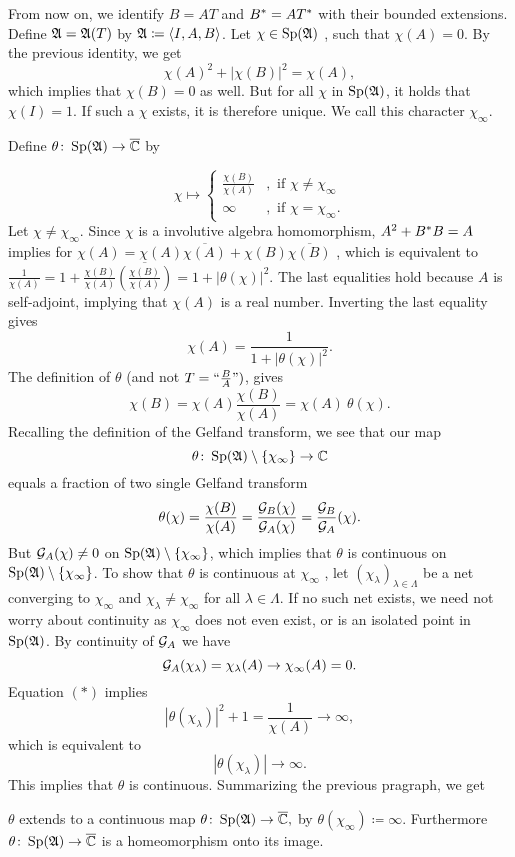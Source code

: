 From now on, we identify $B={AT}$ and $B^{*} ={AT^{*}}$
with their bounded extensions.
Define $\mathfrak{A} = \mathfrak{A}(T)$ by $\mathfrak{A} \coloneqq  \left\langle I, A, B  \right\rangle$. Let $ \chi \in \operatorname{Sp} (\mathfrak{A})$
, such that $\chi(A) =0$. By the previous identity, we get
\[
 \chi(A)^2 + |\chi(B)|^2 = \chi(A),
\]
which implies that $\chi(B) =0$ as well. But for all $\chi$ in  $\operatorname{Sp} (\mathfrak{A})$, 
 it holds that $\chi(I)=1$.
If such a $\chi$ exists, it is therefore unique. We call this
character $\chi_\infty$.

Define $\theta \colon \operatorname{Sp} (\mathfrak{A}) \to {\overline{\mathbb{C}}}$ by

 \[
 \chi \mapsto 
  \begin{cases}
    \frac{\chi(B)}{\chi(A)} &, \text{ if }\chi \neq \chi_\infty\\
    \infty &, \text{ if } \chi = \chi_\infty.
    \end{cases}
 \]
 Let $\chi \neq \chi_\infty$. Since $\chi$ is a involutive algebra homomorphism,
 $A^2 + B^{*} B = A$ implies for
   $\chi(A) = \chi(A) \overline{\chi(A)} + \chi(B) \overline{\chi(B)} $
, which is equivalent to  
  $ \frac{1}{\chi(A)} = 1 + \frac{\chi(B)}{\chi(A)} 
  \overline{\left( \frac{\chi(B)}{\chi(A)} \right)} = 1 + | \theta(\chi)|^2$.
 The last equalities hold because $A$ is self-adjoint, implying that $\chi(A)$ is a real number.
 Inverting the last equality gives
\[
 \chi(A) = \frac{1}{1 + |\theta (\chi)|^2} \tag{$\ast$}.
\]
The definition of $\theta$ (and not  $T = 
`` \frac{B}{A} ")$, gives
\[
 \chi(B) = \chi(A) \frac{\chi(B)}{\chi(A)}= \chi(A)~ \theta(\chi) 
 \tag{$\ast \ast$}.
\]
Recalling the definition of the Gelfand transform, we see that our map
\[
 \theta \colon \operatorname{Sp}(\mathfrak{A}) \setminus \left\lbrace\chi_\infty\right\rbrace \to \mathbb{C}
\]
equals a fraction of two single Gelfand transform
\[
 \theta(\chi) = \frac{\chi(B)}{\chi(A)} = \frac{\mathcal{G}_B (\chi)}{\mathcal{G}_A (\chi)}=
 \frac{\mathcal{G}_B}{\mathcal{G}_A}(\chi).
\]
But $\mathcal{G}_A(\chi) \neq 0$ on $\operatorname{Sp}(\mathfrak{A}) \setminus \left\lbrace\chi_\infty\right\rbrace$, which implies
that $\theta$ is continuous on $\operatorname{Sp}(\mathfrak{A}) \setminus \left\lbrace\chi_\infty\right\rbrace$. 
To show that $\theta$ is continuous at $\chi_\infty$
, let $ \left( \chi_\lambda \right) 
_{\lambda \in \Lambda}$ be a net converging to $\chi_\infty$ and 
$\chi_\lambda \neq \chi_\infty$ for all $\lambda \in \Lambda$. If 
no such net exists, we need not worry about continuity as $\chi_\infty$
does not even exist, or is an isolated point in $\operatorname{Sp}(\mathfrak{A})$.
By continuity of $\mathcal{G}_A$ we have
\[
 \mathcal{G}_A (\chi_\lambda) = \chi_\lambda (A) \to \chi_\infty (A) = 0.
\]
Equation $(\ast)$ implies
\[
 | \theta( \chi_\lambda ) | ^2  + 1 = \frac{1}{\chi(A)} \to \infty,
\]
which is equivalent to 
\[
 | \theta (\chi_\lambda ) | \to \infty.
\]
This implies that $\theta$ is continuous. 
Summarizing the previous pragraph, we get 
\begin{lem}
$\theta$ extends to a continuous map $ \theta \colon \operatorname{Sp}(\mathfrak{A}) \to {\overline{\mathbb{C}}},$
by $\theta (\chi_\infty) \coloneqq \infty$.
Furthermore $\theta \colon \operatorname{Sp} (\mathfrak{A}) \to {\overline{\mathbb{C}}}$ is a homeomorphism onto its image.
\end{lem}

